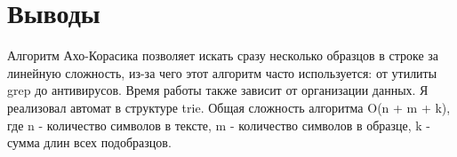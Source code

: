 \section{Выводы}
Алгоритм Ахо-Корасика позволяет искать сразу несколько образцов в строке за линейную сложность, 
из-за чего этот алгоритм часто используется: от утилиты grep до антивирусов.
Время работы также зависит от организации данных. Я реализовал автомат в структуре trie. Общая сложность алгоритма 
O(n + m + k), где n - количество символов в тексте, m - количество символов в образце, k - сумма длин всех подобразцов.

\pagebreak

